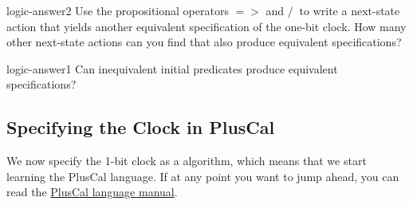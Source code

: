 \begin{aquestion}{logic-answer2}
Use the propositional operators $=>$ and $/\ $ to write a
next-state action that yields another equivalent
specification of the one-bit clock.
How many other next-state actions can you find that also
produce equivalent specifications?  
\end{aquestion}

\begin{aquestion}{logic-answer1}
Can inequivalent initial
predicates produce equivalent specifications?
\end{aquestion}
%


% 




\subsection{Specifying the Clock in PlusCal} 

We now specify the 1-bit clock as a  algorithm,
which means that we start learning the PlusCal language.  If at any
point you want to jump ahead, you can read the
   \hyperref{http://research.microsoft.com/en-us/um/people/lamport/tla/c-manual.pdf}{}{}{PlusCal
  language manual}.

